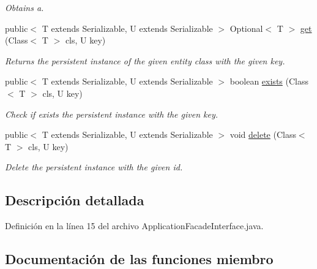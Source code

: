 \begin{DoxyCompactItemize}
\begin{DoxyCompactList}\small\item\em Obtains a. \end{DoxyCompactList}\item 
public$<$ T extends Serializable, U extends Serializable $>$ Optional$<$ T $>$ \mbox{\hyperlink{a00136_ab34954db52378fc9370d4da9a09100c4}{get}} (Class$<$ T $>$ cls, U key)
\begin{DoxyCompactList}\small\item\em Returns the persistent instance of the given entity class with the given key. \end{DoxyCompactList}\item 
public$<$ T extends Serializable, U extends Serializable $>$ boolean \mbox{\hyperlink{a00136_a044c60e4bee5202364454401446b3376}{exists}} (Class$<$ T $>$ cls, U key)
\begin{DoxyCompactList}\small\item\em Check if exists the persistent instance with the given key. \end{DoxyCompactList}\item 
public$<$ T extends Serializable, U extends Serializable $>$ void \mbox{\hyperlink{a00136_ae1d7f5b5d748492f7fab3d621347ffeb}{delete}} (Class$<$ T $>$ cls, U key)
\begin{DoxyCompactList}\small\item\em Delete the persistent instance with the given id. \end{DoxyCompactList}\end{DoxyCompactItemize}


\subsection{Descripción detallada}


Definición en la línea 15 del archivo Application\+Facade\+Interface.\+java.



\subsection{Documentación de las funciones miembro}
\mbox{\label{a00136_acb939a4c57b1136e2e8d1c7b661c10af}} 
